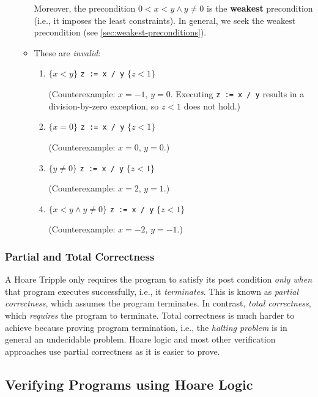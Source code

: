 \documentclass[oneside,11pt,dvipsnames]{book}
\begin{document}
\begin{enumerate}
\begin{itemize}
        Moreover, the precondition \( 0 < x < y \land y \neq 0 \) is the \textbf{weakest} precondition (i.e., it imposes the least constraints). In general, we seek the weakest precondition (see \autoref{sec:weakest-preconditions}).
  
    \item These are \emph{invalid}:
  
    \begin{enumerate}
    \item
      \( \{ x < y \} \) \texttt{z := x / y} \( \{ z < 1 \} \)
  
      (Counterexample: \( x = -1 \), \( y = 0 \). Executing \texttt{z := x / y} results in a division-by-zero exception, so \( z < 1 \) does not hold.)
    \item
      \( \{ x = 0 \} \) \texttt{z := x / y} \( \{ z < 1 \} \)
  
      (Counterexample: \( x = 0 \), \( y = 0 \).)
    \item
      \( \{ y \neq 0 \} \) \texttt{z := x / y} \( \{ z < 1 \} \)
  
      (Counterexample: \( x = 2 \), \( y = 1 \).)
    \item
      \( \{ x < y \land y \neq 0 \} \) \texttt{z := x / y} \( \{ z < 1 \} \)
  
      (Counterexample: \( x = -2 \), \( y = -1 \).)
    \end{enumerate}
\end{itemize}

\end{enumerate}



\subsubsection{Partial and Total Correctness} A Hoare Tripple only requires the program to satisfy its post condition \emph{only when} that program executes successfully, i.e., it \emph{terminates}. This is known as \emph{partial correctness}, which {assumes} the program terminates. In contrast, \emph{total correctness}, which \emph{requires} the program to terminate.  Total correctness is much harder to achieve because proving program termination, i.e., the \emph{halting problem} is in general an undecidable problem.  Hoare logic and most other verification approaches use partial correctness as it is easier to prove.  

\subsection{Verifying Programs using Hoare Logic}\label{sec:verification-hoare}
\end{document}
